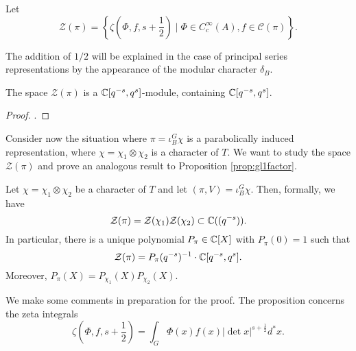 \begin{notn}
    Let $$\mathcal Z(\pi) = \left\{\zeta\left(\Phi,f,s+\frac{1}{2}\right) \mid \Phi \in C_c^\infty(A), f \in \mathcal C(\pi)\right\}.$$
\end{notn}
\begin{rem}
    The addition of $1/2$ will be explained in the case of principal series representations by the appearance of the modular character $\delta_B$.
\end{rem}

\begin{lemma}
    The space $\mathcal Z(\pi)$ is a $\mathbb{C}[q^{-s},q^s]$-module, containing $\mathbb{C}[q^{-s},q^s]$.
\end{lemma}
\begin{proof}
    \cite[Lemma 24.4.2]{BH1}.
\end{proof}


Consider now the situation where $\pi = \iota_B^G \chi$ is a parabolically induced representation, where $\chi = \chi_1 \otimes \chi_2$ is a character of $T$. We want to study the space $\mathcal Z(\pi)$ and prove an analogous result to Proposition \ref{prop:gl1factor}.





\begin{prop}\label{prop:gl2factor}
    Let $\chi=\chi_1\otimes \chi_2$ be a character of $T$ and let $(\pi,V)=\iota_B^G \chi$. Then, formally, we have
    $$\mathcal Z(\pi) = \mathcal Z(\chi_1) \mathcal Z(\chi_2) \subset \mathbb{C}((q^{-s})).$$
    In particular, there is a unique polynomial $P_\pi \in \mathbb{C}[X]$ with $P_\pi(0)=1$ such that 
    $$\mathcal Z(\pi) = P_\pi(q^{-s})^{-1} \cdot \mathbb{C}[q^{-s},q^s].$$
    Moreover, $P_\pi(X) = P_{\chi_1}(X)P_{\chi_2}(X)$.
\end{prop}

We make some comments in preparation for the proof. The proposition concerns the zeta integrals 
$$\zeta\left(\Phi,f,s+\frac{1}{2}\right) = \int_{G} \Phi(x)f(x)|\det x|^{s+\frac{1}{2}} d^*x.$$

